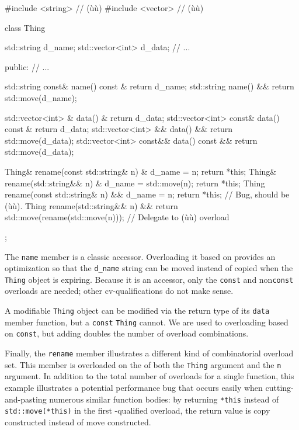 \begin{emcppslisting}
#include <string>  // (ù{}ù)
#include <vector>  // (ù{}ù)

class Thing
{
    std::string      d_name;
    std::vector<int> d_data;
    // ...

public:
    // ...

    std::string const& name() const & { return d_name; }
    std::string        name() &&      { return std::move(d_name); }

    std::vector<int>      &  data()       &  { return d_data; }
    std::vector<int> const&  data() const &  { return d_data; }
    std::vector<int>      && data()       && { return std::move(d_data); }
    std::vector<int> const&& data() const && { return std::move(d_data); }

    Thing& rename(const std::string& n) &  { d_name = n; return *this; }
    Thing& rename(std::string&& n) &  { d_name = std::move(n); return *this; }
    Thing  rename(const std::string& n) &&
    {
        d_name = n;
        return *this;  // Bug, should be (ù{}ù).
    }
    Thing  rename(std::string&& n) &&
    {
        return std::move(rename(std::move(n)));  // Delegate to (ù{}ù) overload
    }
};
\end{emcppslisting}
    

\noindent The \lstinline!name! member is a classic accessor. Overloading it based on
 provides an optimization so that the
\lstinline!d_name! string can be moved instead of copied when the
\lstinline!Thing! object is expiring. Because it is an accessor, only the
\lstinline!const!  and non\lstinline!const! 
overloads are needed; other cv-qualifications do not make sense.

A modifiable \lstinline!Thing! object can be modified via the return type
of its \lstinline!data! member function, but a \lstinline!const!
\lstinline!Thing! cannot. We are used to overloading based on
\lstinline!const!, but adding  doubles the number
of overload combinations.

Finally, the \lstinline!rename! member illustrates a different kind of
combinatorial overload set. This member is overloaded on the
 of both the \lstinline!Thing! argument and the
\lstinline!n! argument. In addition to the total number of overloads for a
single function, this example illustrates a potential performance bug
that occurs easily when cutting-and-pasting numerous similar function
bodies: by returning \lstinline!*this! instead of \lstinline!std::move(*this)!
in the first -qualified overload, the return value is copy
constructed instead of move constructed.

